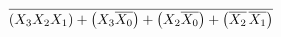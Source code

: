 \documentclass[preview]{standalone}
\begin{document}
\begin{align*}
\overline{\left(X_3X_2X_1\right)+\left(X_3\overline{X_0}\right)+\left(X_2\overline{X_0}\right)+\left(\overline{X_2}\hspace{0.05cm}\overline{X_1}\right)}
\end{align*}
\end{document}
